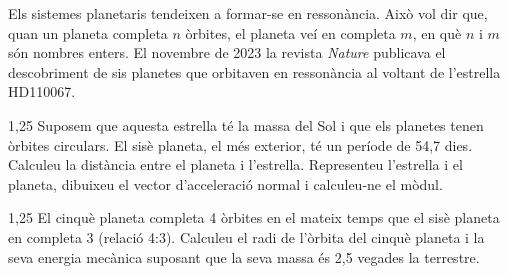 Els sistemes planetaris tendeixen a formar-se en ressonància. Això vol dir que, quan un planeta completa $n$ òrbites, el planeta veí en completa $m$, en què $n$ i $m$ són nombres enters. El novembre de 2023 la revista \textit{Nature} publicava el descobriment de sis planetes que orbitaven en ressonància al voltant de l'estrella HD110067.

\begin{apartat}{1,25}
Suposem que aquesta estrella té la massa del Sol i que els planetes tenen òrbites circulars. El sisè planeta, el més exterior, té un període de 54,7 dies. Calculeu la distància entre el planeta i l'estrella. Representeu l'estrella i el planeta, dibuixeu el vector d'acceleració normal i calculeu-ne el mòdul.
\end{apartat}

\begin{apartat}{1,25}
El cinquè planeta completa 4 òrbites en el mateix temps que el sisè planeta en completa 3 (relació 4:3). Calculeu el radi de l'òrbita del cinquè planeta i la seva energia mecànica suposant que la seva massa és 2,5 vegades la terrestre.
\end{apartat}


